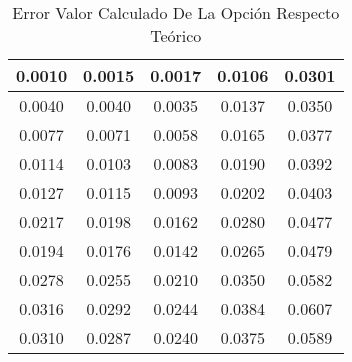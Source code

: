 \begin{table}                                
\centering                                   
\begin{tabular}{|c|c|c|c|c|}                 
\hline                                       
0.0010 & 0.0015 & 0.0017 & 0.0106 & 0.0301 \\
\hline                                       
0.0040 & 0.0040 & 0.0035 & 0.0137 & 0.0350 \\
\hline                                       
0.0077 & 0.0071 & 0.0058 & 0.0165 & 0.0377 \\
\hline                                       
0.0114 & 0.0103 & 0.0083 & 0.0190 & 0.0392 \\
\hline                                       
0.0127 & 0.0115 & 0.0093 & 0.0202 & 0.0403 \\
\hline                                       
0.0217 & 0.0198 & 0.0162 & 0.0280 & 0.0477 \\
\hline                                       
0.0194 & 0.0176 & 0.0142 & 0.0265 & 0.0479 \\
\hline                                       
0.0278 & 0.0255 & 0.0210 & 0.0350 & 0.0582 \\
\hline                                       
0.0316 & 0.0292 & 0.0244 & 0.0384 & 0.0607 \\
\hline                                       
0.0310 & 0.0287 & 0.0240 & 0.0375 & 0.0589 \\
\hline                                       
\end{tabular}                                
\caption{Error Valor Calculado De La Opción Respecto Teórico}                   
\label{table:MyTableLabel}                   
\end{table}     